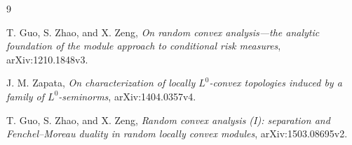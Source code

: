 \documentclass[10pt]{article}
\begin{document}
\begin{thebibliography}{9}
\small
\raggedright

T. Guo, S. Zhao, and X. Zeng,
\emph{On random convex analysis---the analytic foundation of the module
approach to conditional risk measures}, arXiv:1210.1848v3.

J. M. Zapata,
\emph{On characterization of locally $L^0$-convex topologies induced by a
family of $L^0$-seminorms}, arXiv:1404.0357v4.

T. Guo, S. Zhao, and X. Zeng,
\emph{Random convex analysis (I): separation and Fenchel--Moreau duality in
random locally convex modules}, arXiv:1503.08695v2.

\end{thebibliography}
\end{document}
